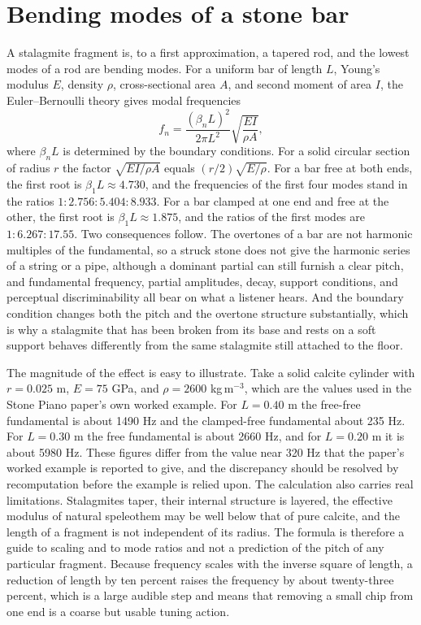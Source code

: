 \documentclass[12pt]{article}
\begin{document}
\section{Bending modes of a stone bar}

A stalagmite fragment is, to a first approximation, a tapered rod, and the lowest modes of a rod are bending modes. For a uniform bar of length $L$, Young's modulus $E$, density $\rho$, cross-sectional area $A$, and second moment of area $I$, the Euler--Bernoulli theory gives modal frequencies
\begin{equation}
f_n = \frac{(\beta_n L)^2}{2\pi L^2}\sqrt{\frac{EI}{\rho A}},
\end{equation}
where $\beta_n L$ is determined by the boundary conditions. For a solid circular section of radius $r$ \cite{fletcher} the factor $\sqrt{EI/\rho A}$ equals $(r/2)\sqrt{E/\rho}$. For a bar free at both ends, the first root is $\beta_1 L \approx 4.730$, and the frequencies of the first four modes stand in the ratios $1 : 2.756 : 5.404 : 8.933$. For a bar clamped at one end and free at the other, the first root is $\beta_1 L \approx 1.875$, and the ratios of the first modes are $1 : 6.267 : 17.55$. Two consequences follow. The overtones of a bar are not harmonic multiples of the fundamental, so a struck stone does not give the harmonic series of a string or a pipe, although a dominant partial can still furnish a clear pitch, and fundamental frequency, partial amplitudes, decay, support conditions, and perceptual discriminability all bear on what a listener hears. And the boundary condition changes both the pitch and the overtone structure substantially, which is why a stalagmite that has been broken from its base and rests on a soft support behaves differently from the same stalagmite still attached to the floor.

The magnitude of the effect is easy to illustrate. Take a solid calcite cylinder with $r = 0.025$ m, $E = 75$ GPa, and $\rho = 2600$ kg\,m$^{-3}$, which are the values used in the Stone Piano paper's own worked example. For $L = 0.40$ m the free-free fundamental is about 1490 Hz and the clamped-free fundamental about 235 Hz. For $L = 0.30$ m the free fundamental is about 2660 Hz, and for $L = 0.20$ m it is about 5980 Hz. These figures differ from the value near 320 Hz that the paper's worked example is reported to give, and the discrepancy should be resolved by recomputation before the example is relied upon. The calculation also carries real limitations. Stalagmites taper, their internal structure is layered, the effective modulus of natural speleothem may be well below that of pure calcite, and the length of a fragment is not independent of its radius. The formula is therefore a guide to scaling and to mode ratios and not a prediction of the pitch of any particular fragment. Because frequency scales with the inverse square of length, a reduction of length by ten percent raises the frequency by about twenty-three percent, which is a large audible step and means that removing a small chip from one end is a coarse but usable tuning action.
\end{document}
